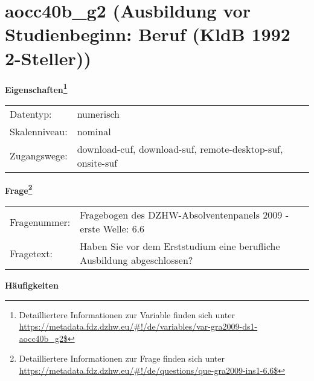 
    \setcounter{footnote}{0}

    \vspace*{-1.8cm}
	\section{aocc40b\_g2 (Ausbildung vor Studienbeginn: Beruf (KldB 1992 2-Steller))}
	\label{section:aocc40b_g2}



    \vspace*{0.5cm}
    \noindent\textbf{Eigenschaften\footnote{Detailliertere Informationen zur Variable finden sich unter
		\url{https://metadata.fdz.dzhw.eu/\#!/de/variables/var-gra2009-ds1-aocc40b_g2$}}}\\
	\begin{tabularx}{\hsize}{@{}lX}
	Datentyp: & numerisch \\
	Skalenniveau: & nominal \\
	Zugangswege: &
	  download-cuf, 
	  download-suf, 
	  remote-desktop-suf, 
	  onsite-suf
 \\
    \end{tabularx}



				\vspace*{0.5cm}
                \noindent\textbf{Frage\footnote{Detailliertere Informationen zur Frage finden sich unter
		              \url{https://metadata.fdz.dzhw.eu/\#!/de/questions/que-gra2009-ins1-6.6$}}}\\
				\begin{tabularx}{\hsize}{@{}lX}
					Fragenummer: &
					  Fragebogen des DZHW-Absolventenpanels 2009 - erste Welle:
					  6.6
 \\
					Fragetext: & Haben Sie vor dem Erststudium eine berufliche Ausbildung abgeschlossen? \\
				\end{tabularx}





        		\vspace*{0.5cm}
                \noindent\textbf{Häufigkeiten}

